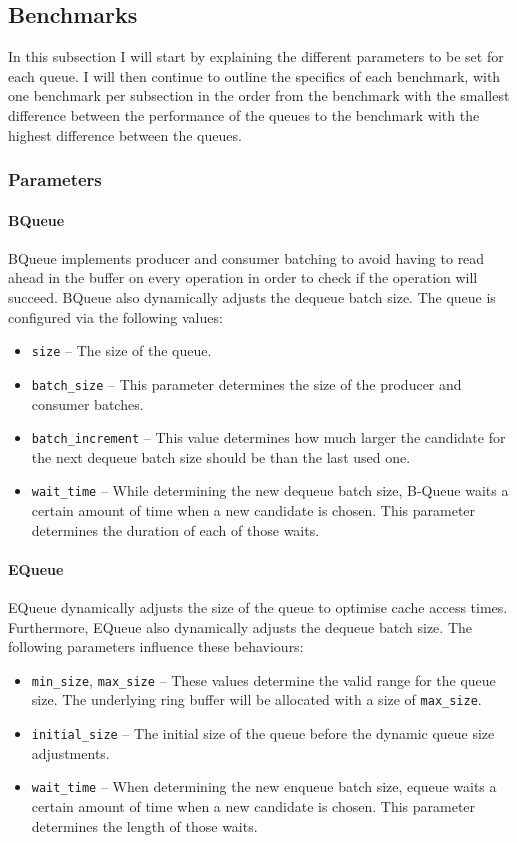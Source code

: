 \subsection{Benchmarks}
In this subsection I will start by explaining the different parameters to be set for each queue.
I will then continue to outline the specifics of each benchmark, with one benchmark per subsection in the
order from the benchmark with the smallest difference between the performance of the queues to the benchmark
with the highest difference between the queues.

\subsubsection{Parameters}
\paragraph{BQueue}
BQueue implements producer and consumer batching to avoid having to read ahead in the buffer on every
operation in order to check if the operation will succeed. BQueue also dynamically adjusts the dequeue batch
size. The queue is configured via the following values:
\begin{itemize}
    \item \texttt{size} -- The size of the queue.
    \item \texttt{batch\_size} -- This parameter determines the size of the producer and consumer batches.
    \item \texttt{batch\_increment} -- This value determines how much larger the candidate for the next
        dequeue batch size should be than the last used one.
    \item \texttt{wait\_time} -- While determining the new dequeue batch size, B-Queue waits a certain amount
        of time when a new candidate is chosen. This parameter determines the duration of each of those waits.
\end{itemize}

\paragraph{EQueue}
EQueue dynamically adjusts the size of the queue to optimise cache access times\cite{EQueue}. Furthermore,
EQueue also dynamically adjusts the dequeue batch size. The following parameters influence these behaviours:
\begin{itemize}
    \item \texttt{min\_size}, \texttt{max\_size} -- These values determine the valid range for the queue size. The
        underlying ring buffer will be allocated with a size of \texttt{max\_size}.
    \item \texttt{initial\_size} -- The initial size of the queue before the dynamic queue size adjustments.
    \item \texttt{wait\_time} -- When determining the new enqueue batch size, equeue waits a certain amount of
        time when a new candidate is chosen. This parameter determines the length of those waits.
\end{itemize}

